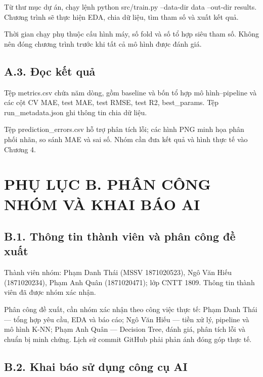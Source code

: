 \documentclass[12pt,a4paper,oneside]{article}
\begin{document}
Từ thư mục dự án, chạy lệnh python src/train.py --data-dir data
--out-dir results. Chương trình sẽ thực hiện EDA, chia dữ liệu, tìm tham
số và xuất kết quả.

Thời gian chạy phụ thuộc cấu hình máy, số fold và số tổ hợp siêu tham
số. Không nên đóng chương trình trước khi tất cả mô hình được đánh giá.

\subsection*{A.3. Đọc kết quả}

Tệp metrics.csv chứa năm dòng, gồm baseline và bốn tổ hợp mô
hình--pipeline và các cột CV MAE, test MAE, test RMSE, test R2,
best\_params. Tệp run\_metadata.json ghi thông tin chia dữ liệu.

Tệp prediction\_errors.csv hỗ trợ phân tích lỗi; các hình PNG minh họa
phân phối nhãn, so sánh MAE và sai số. Nhóm cần đưa kết quả và hình thực
tế vào Chương 4.

\section*{PHỤ LỤC B. PHÂN CÔNG NHÓM VÀ KHAI BÁO AI}

\subsection*{B.1. Thông tin thành viên và phân công đề xuất}

Thành viên nhóm: Phạm Danh Thái (MSSV 1871020523), Ngô Văn Hiếu
(1871020234), Phạm Anh Quân (1871020471); lớp CNTT 1809. Thông tin thành
viên đã được nhóm xác nhận.

Phân công đề xuất, cần nhóm xác nhận theo công việc thực tế: Phạm Danh
Thái --- tổng hợp yêu cầu, EDA và báo cáo; Ngô Văn Hiếu --- tiền xử lý,
pipeline và mô hình K-NN; Phạm Anh Quân --- Decision Tree, đánh giá,
phân tích lỗi và chuẩn bị minh chứng. Lịch sử commit GitHub phải phản
ánh đóng góp thực tế.

\subsection*{B.2. Khai báo sử dụng công cụ AI}
\end{document}
